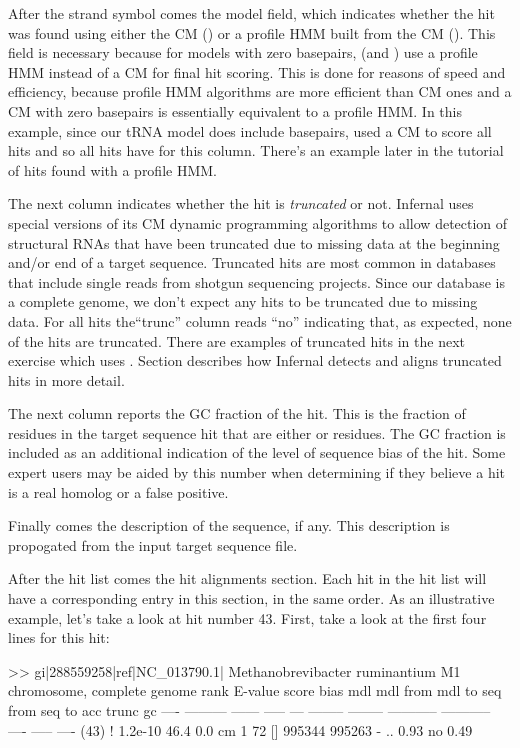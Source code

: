 After the strand symbol comes the model field, which indicates whether
the hit was found using either the CM () or a profile HMM
built from the CM (). This field is necessary because for
models with zero basepairs,  (and ) use a
profile HMM instead of a CM for final hit scoring. This is done for
reasons of speed and efficiency, because profile HMM algorithms are
more efficient than CM ones and a CM with zero basepairs is
essentially equivalent to a profile HMM. In this example, since our
tRNA model does include basepairs,  used a CM to score
all hits and so all hits have  for this column. There's an
example later in the tutorial of hits found with a profile HMM.

The next column indicates whether the hit is \emph{truncated} or
not. Infernal uses special versions of its CM dynamic programming
algorithms to allow detection of structural RNAs that have been
truncated due to missing data at the beginning and/or end of a target
sequence. Truncated hits are most common in databases that include
single reads from shotgun sequencing projects. Since our database is a
complete genome, we don't expect any hits to be truncated due to
missing data. For all hits the``trunc'' column reads
``no'' indicating that, as expected, none of the hits are
truncated. There are examples of truncated hits in the next exercise
which uses . Section describes how
Infernal detects and aligns truncated hits in more detail.

The next column reports the GC fraction of the hit. This is the
fraction of residues in the target sequence hit that are either
 or  residues. The GC fraction is included as an
additional indication of the level of sequence bias of the hit. Some
expert users may be aided by this number when determining if they
believe a hit is a real homolog or a false positive.

Finally comes the description of the sequence, if any. This
description is propogated from the input target sequence file.

After the hit list comes the hit alignments section. Each hit in 
the hit list will have a corresponding entry in this section, in the
same order. As an illustrative example, let's take a look at
hit number 43. First, take a look at the first four lines for this
hit: 

\begin{sreoutput}
>> gi|288559258|ref|NC_013790.1|  Methanobrevibacter ruminantium M1 chromosome, complete genome
 rank     E-value  score  bias mdl mdl from   mdl to       seq from      seq to       acc trunc   gc
 ----   --------- ------ ----- --- -------- --------    ----------- -----------      ---- ----- ----
 (43) !   1.2e-10   46.4   0.0  cm        1       72 []      995344      995263 - .. 0.93    no 0.49
\end{sreoutput}

